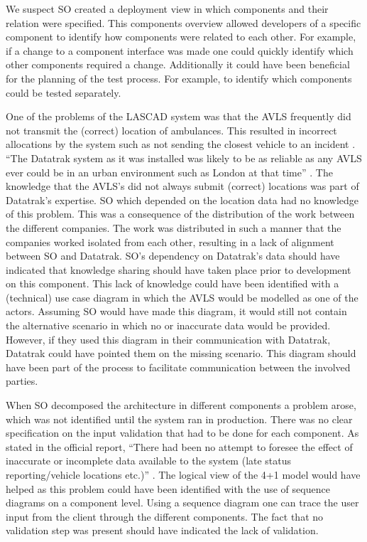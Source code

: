 We suspect SO created a deployment view in which components and their relation were specified.
This components overview allowed developers of a specific component to identify how components were related to each other.
For example, if a change to a component interface was made one could quickly identify which other components required a change.
Additionally it could have been beneficial for the planning of the test process.
For example, to identify which components could be tested separately.

One of the problems of the LASCAD system was that the AVLS frequently did not transmit the (correct) location of ambulances.
This resulted in incorrect allocations by the system such as not sending the closest vehicle to an incident \autocite[4022]{officialreport}.
``The Datatrak system as it was installed was likely to be as reliable as any AVLS ever could be in an urban environment such as London at that time'' \autocite[3133]{officialreport}.
The knowledge that the AVLS’s did not always submit (correct) locations was part of Datatrak’s expertise.
SO which depended on the location data had no knowledge of this problem.
This was a consequence of the distribution of the work between the different companies.
The work was distributed in such a manner that the companies worked isolated from each other, resulting in a lack of alignment between SO and Datatrak.
SO’s dependency on Datatrak’s data should have indicated that knowledge sharing should have taken place prior to development on this component.
This lack of knowledge could have been identified with a (technical) use case diagram in which the AVLS would be modelled as one of the actors.
Assuming SO would have made this diagram, it would still not contain the alternative scenario in which no or inaccurate data would be provided.
However, if they used this diagram in their communication with Datatrak, Datatrak could have pointed them on the missing scenario.
This diagram should have been part of the process to facilitate communication between the involved parties.

When SO decomposed the architecture in different components a problem arose, which was not identified until the system ran in production.
There was no clear specification on the input validation that had to be done for each component.
As stated in the official report, ``There had been no attempt to foresee the effect of inaccurate or incomplete data available to the system (late status reporting/vehicle locations etc.)'' \autocite[4001]{officialreport}.
The logical view of the 4+1 model would have helped as this problem could have been identified with the use of sequence diagrams on a component level.
Using a sequence diagram one can trace the user input from the client through the different components.
The fact that no validation step was present should have indicated the lack of validation.